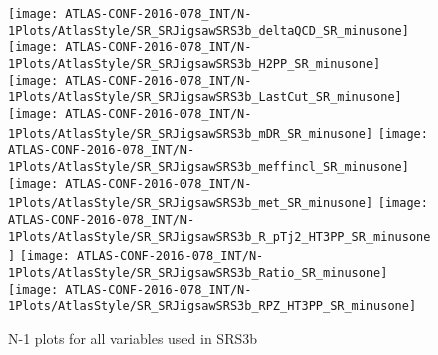 \begin{figure}[tbp]
\begin{center}
\texttt{[image: ATLAS-CONF-2016-078\_INT/N-1Plots/AtlasStyle/SR\_SRJigsawSRS3b\_deltaQCD\_SR\_minusone]}
\texttt{[image: ATLAS-CONF-2016-078\_INT/N-1Plots/AtlasStyle/SR\_SRJigsawSRS3b\_H2PP\_SR\_minusone]}
\texttt{[image: ATLAS-CONF-2016-078\_INT/N-1Plots/AtlasStyle/SR\_SRJigsawSRS3b\_LastCut\_SR\_minusone]}
\texttt{[image: ATLAS-CONF-2016-078\_INT/N-1Plots/AtlasStyle/SR\_SRJigsawSRS3b\_mDR\_SR\_minusone]}
\texttt{[image: ATLAS-CONF-2016-078\_INT/N-1Plots/AtlasStyle/SR\_SRJigsawSRS3b\_meffincl\_SR\_minusone]}
\texttt{[image: ATLAS-CONF-2016-078\_INT/N-1Plots/AtlasStyle/SR\_SRJigsawSRS3b\_met\_SR\_minusone]}
\texttt{[image: ATLAS-CONF-2016-078\_INT/N-1Plots/AtlasStyle/SR\_SRJigsawSRS3b\_R\_pTj2\_HT3PP\_SR\_minusone]}
\texttt{[image: ATLAS-CONF-2016-078\_INT/N-1Plots/AtlasStyle/SR\_SRJigsawSRS3b\_Ratio\_SR\_minusone]}
\texttt{[image: ATLAS-CONF-2016-078\_INT/N-1Plots/AtlasStyle/SR\_SRJigsawSRS3b\_RPZ\_HT3PP\_SR\_minusone]}
\end{center}
\caption{N-1 plots for all variables used in SRS3b}
\label{fig:SR_SRJigsawSRS3a_meffincl_SR_minusone}
\end{figure}
